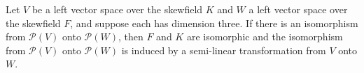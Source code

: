 Let $V$ be a left vector space over the skewfield $K$ and $W$ a left vector space over the skewfield $F$, and suppose each has dimension three. If there is an isomorphism from $\mathcal{P}(V)$ onto $\mathcal{P}(W)$, then $F$ and $K$ are isomorphic and the isomorphism from $\mathcal{P}(V)$ onto $\mathcal{P}(W)$ is induced by a semi-linear transformation from $V$ onto $W$.
